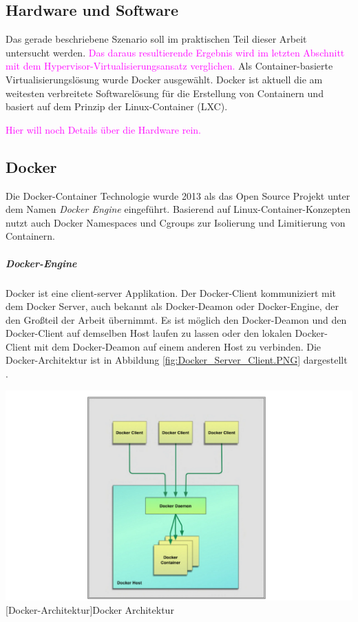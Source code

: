 \subsection{Hardware und Software}

Das gerade beschriebene Szenario soll im praktischen Teil dieser Arbeit untersucht werden. \textcolor{magenta}{Das daraus resultierende Ergebnis wird im letzten Abschnitt mit dem Hypervisor-Virtualisierungsansatz verglichen.} Als Container-basierte Virtualisierungslösung wurde Docker ausgewählt. Docker ist aktuell die am weitesten verbreitete Softwarelösung für die Erstellung von Containern und basiert auf dem Prinzip der Linux-Container (LXC).

\textcolor{magenta}{Hier will noch Details über die Hardware rein.}



\subsection{Docker}
Die Docker-Container Technologie wurde 2013 als das Open Source Projekt unter dem Namen \emph{Docker Engine} eingeführt. Basierend auf Linux-Container-Konzepten nutzt auch Docker Namespaces und Cgroups zur Isolierung und Limitierung von Containern.  

\subparagraph{Docker-Engine}
Docker ist eine client-server Applikation. Der Docker-Client kommuniziert mit dem Docker Server, auch bekannt als Docker-Deamon oder Docker-Engine, der den Großteil der Arbeit übernimmt. Es ist möglich den Docker-Deamon und den Docker-Client auf demselben Host laufen zu lassen oder den lokalen Docker-Client mit dem Docker-Deamon auf einem anderen Host zu verbinden. Die Docker-Architektur ist in Abbildung \ref{fig:Docker_Server_Client.PNG} dargestellt \cite{Turnbull2015TheBook}.

\vspace{1em}
\begin{minipage}{\linewidth}
	\centering
	\includegraphics[width=1\linewidth]{pics/Docker_Server_Client.PNG}
	[Docker-Architektur\cite{Turnbull2015TheBook}]{Docker Architektur}
	\label{fig:Docker_Server_Client.PNG}
\end{minipage}


